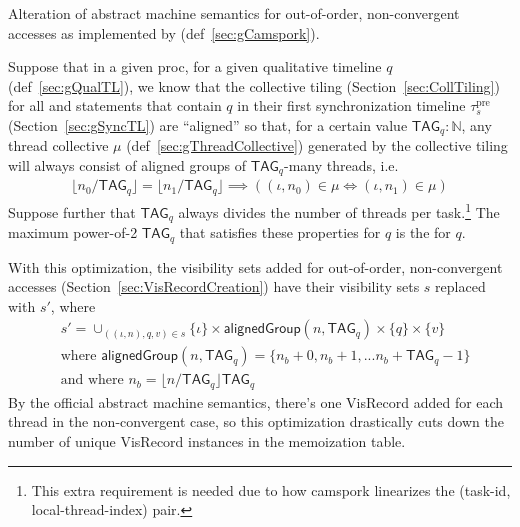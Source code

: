 
Alteration of abstract machine semantics for out-of-order, non-convergent accesses as implemented by  (def~\ref{sec:gCamspork}).

Suppose that in a given proc, for a given qualitative timeline $q$ (def~\ref{sec:gQualTL}), we know that the collective tiling (Section~\ref{sec:CollTiling}) for all  and  statements that contain $q$ in their first synchronization timeline $\tau_s^\mathrm{pre}$ (Section~\ref{sec:gSyncTL}) are ``aligned'' so that, for a certain value $\mathsf{TAG}_q: \mathbb{N}$, any thread collective $\mu$ (def~\ref{sec:gThreadCollective}) generated by the collective tiling will always consist of aligned groups of $\mathsf{TAG}_q$-many threads, i.e.
\begin{gather*}
    \lfloor n_0 / \mathsf{TAG}_q \rfloor = \lfloor n_1 / \mathsf{TAG}_q \rfloor
    \implies
    ((\iota, n_0) \in \mu \iff (\iota, n_1) \in \mu)
\end{gather*}
Suppose further that $\mathsf{TAG}_q$ always divides the number of threads per task.\footnote{This extra requirement is needed due to how camspork linearizes the (task-id, local-thread-index) pair.}
The maximum power-of-2 $\mathsf{TAG}_q$ that satisfies these properties for $q$ is the  for $q$.

With this optimization, the visibility sets added for out-of-order, non-convergent accesses (Section~\ref{sec:VisRecordCreation}) have their visibility sets $s$ replaced with $s'$, where
\begin{align*}
    & s' = \cup_{((\iota, n), q, v) \in s} \{ \iota \} \times \mathsf{alignedGroup}(n, \mathsf{TAG}_q) \times \{ q \} \times \{ v \} \\
    & \text{where } \mathsf{alignedGroup}(n, \mathsf{TAG}_q) = \{ n_b + 0, n_b + 1, ... n_b + \mathsf{TAG}_q - 1 \} \\
    & \text{and where } n_b = \lfloor n / \mathsf{TAG}_q \rfloor \mathsf{TAG}_q
\end{align*}
By the official abstract machine semantics, there's one \textsf{VisRecord} added for each thread in the non-convergent case, so this optimization drastically cuts down the number of unique \textsf{VisRecord} instances in the  memoization table.

